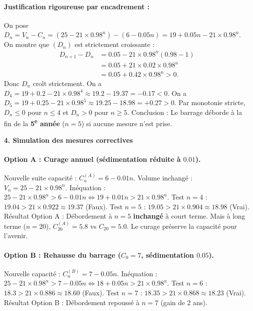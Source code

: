 \documentclass[11pt]{article}
\newcommand{\cle}[1]{{\popxbold\color{popdark}#1}}
\begin{document}
\begin{exoresolu}
\paragraph{Justification rigoureuse par encadrement :}
On pose $D_n = V_n - C_n = (\num{25} - \num{21} \times \num{0,98}^n) - (\num{6} - \num{0,05} n) = \num{19} + \num{0,05} n - \num{21} \times \num{0,98}^n$.
On montre que $(D_n)$ est strictement croissante :
\begin{align*}
D_{n+1} - D_n &= \num{0,05} - \num{21} \times \num{0,98}^n (\num{0,98} - 1) \\
&= \num{0,05} + \num{21} \times \num{0,02} \times \num{0,98}^n \\
&= \num{0,05} + \num{0,42} \times \num{0,98}^n > 0.
\end{align*}
Donc $D_n$ croît strictement.
On a $D_4 = \num{19} + \num{0,2} - \num{21} \times \num{0,98}^4 \approx \num{19,2} - \num{19,37} = -\num{0,17} < 0$.
On a $D_5 = \num{19} + \num{0,25} - \num{21} \times \num{0,98}^5 \approx \num{19,25} - \num{18,98} = +\num{0,27} > 0$.
Par monotonie stricte, $D_n \le 0$ pour $n \le 4$ et $D_n > 0$ pour $n \ge 5$.
\cle{Conclusion :} Le barrage déborde à la fin de la \textbf{5\textsuperscript{e} année} ($n=5$) si aucune mesure n'est prise.

\textbf{4. Simulation des mesures correctives}\par
\paragraph{Option A : Curage annuel (sédimentation réduite à $\num{0,01}$).}
Nouvelle suite capacité : $C_n^{(A)} = \num{6} - \num{0,01} n$.
Volume inchangé : $V_n = \num{25} - \num{21} \times \num{0,98}^n$.
Inéquation : $\num{25} - \num{21} \times \num{0,98}^n > \num{6} - \num{0,01} n \iff \num{19} + \num{0,01} n > \num{21} \times \num{0,98}^n$.
Test $n=4$ : $\num{19,04} > \num{21} \times \num{0,922} \approx \num{19,37}$ (Faux).
Test $n=5$ : $\num{19,05} > \num{21} \times \num{0,904} \approx \num{18,98}$ (Vrai).
\cle{Résultat Option A :} Débordement à $n=5$ \textbf{inchangé} à court terme. Mais à long terme ($n=20$), $C_{20}^{(A)} = \num{5,8}$ vs $C_{20} = \num{5,0}$. Le curage préserve la capacité pour l'avenir.

\paragraph{Option B : Rehausse du barrage ($C_0 = \num{7}$, sédimentation $\num{0,05}$).}
Nouvelle capacité : $C_n^{(B)} = \num{7} - \num{0,05} n$.
Inéquation : $\num{25} - \num{21} \times \num{0,98}^n > \num{7} - \num{0,05} n \iff \num{18} + \num{0,05} n > \num{21} \times \num{0,98}^n$.
Test $n=6$ : $\num{18,3} > \num{21} \times \num{0,886} \approx \num{18,60}$ (Faux).
Test $n=7$ : $\num{18,35} > \num{21} \times \num{0,868} \approx \num{18,23}$ (Vrai).
\cle{Résultat Option B :} Débordement repoussé à $n=7$ (gain de 2 ans).


\end{exoresolu}
\end{document}
